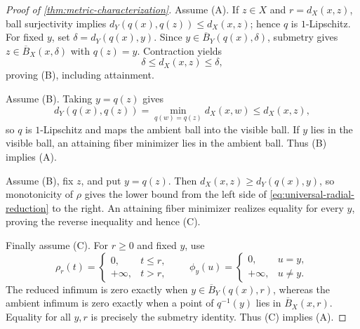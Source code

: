 \documentclass[10pt]{article}
\theoremstyle{plain}
\theoremstyle{definition}
\theoremstyle{remark}
\begin{document}
\begin{proof}[Proof of \cref{thm:metric-characterization}]
Assume (A).  If \(z\in X\) and \(r=d_X(x,z)\), ball surjectivity implies
\(d_Y(q(x),q(z))\le d_X(x,z)\); hence \(q\) is \(1\)-Lipschitz.  For fixed
\(y\), set \(\delta=d_Y(q(x),y)\).  Since
\(y\in\overline B_Y(q(x),\delta)\), submetry gives
\(z\in\overline B_X(x,\delta)\) with \(q(z)=y\).  Contraction yields
\[
  \delta\le d_X(x,z)\le\delta,
\]
proving (B), including attainment.

Assume (B).  Taking \(y=q(z)\) gives
\[
  d_Y(q(x),q(z))
  =\min_{q(w)=q(z)}d_X(x,w)
  \le d_X(x,z),
\]
so \(q\) is \(1\)-Lipschitz and maps the ambient ball into the visible ball.
If \(y\) lies in the visible ball, an attaining fiber minimizer lies in the
ambient ball.  Thus (B) implies (A).

Assume (B), fix \(z\), and put \(y=q(z)\).  Then
\(d_X(x,z)\ge d_Y(q(x),y)\), so monotonicity of \(\rho\) gives the lower
bound from the left side of \eqref{eq:universal-radial-reduction} to the
right.  An attaining fiber minimizer realizes equality for every \(y\),
proving the reverse inequality and hence (C).

Finally assume (C).  For \(r\ge0\) and fixed \(y\), use
\[
  \rho_r(t)=\begin{cases}0,&t\le r,\\+\infty,&t>r,\end{cases}
  \qquad
  \phi_y(u)=\begin{cases}0,&u=y,\\+\infty,&u\ne y.\end{cases}
\]
The reduced infimum is zero exactly when
\(y\in\overline B_Y(q(x),r)\), whereas the ambient infimum is zero exactly
when a point of \(q^{-1}(y)\) lies in \(\overline B_X(x,r)\).  Equality for
all \(y,r\) is precisely the submetry identity.  Thus (C) implies (A).
\end{proof}
\end{document}
